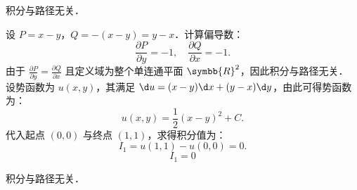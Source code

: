 \begin{solution}
     积分与路径无关．

    设 $P = x - y$，$Q = -(x - y) = y - x$．计算偏导数：
    \begin{equation}
        \label{eq:deriv-check-1}
        \frac{\partial P}{\partial y} = -1, \quad \frac{\partial Q}{\partial x} = -1.
    \end{equation}
    由于 $\frac{\partial P}{\partial y} = \frac{\partial Q}{\partial x}$ 且定义域为整个单连通平面 $\symbb{R}^2$，因此积分与路径无关．
    设势函数为 $u(x, y)$，其满足 $\d u = (x - y) \d x + (y - x) \d y$，由此可得势函数为：
    \begin{equation}
        u(x, y) = \frac{1}{2} (x - y)^2 + C.
    \end{equation}
    代入起点 $(0,0)$ 与终点 $(1,1)$，求得积分值为：
    \begin{equation}
        I_1 = u(1,1) - u(0,0) = 0.
    \end{equation}
    \begin{equation}
        I_1 = \boxed{0}
    \end{equation}

     积分与路径无关．


\end{solution}
